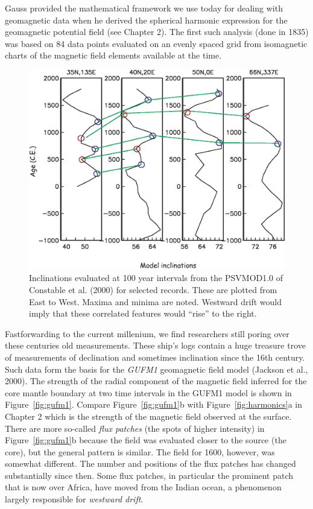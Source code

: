 Gauss provided the mathematical framework we use today for dealing with geomagnetic data when he derived the spherical harmonic expression for the geomagnetic potential field (see Chapter  2).  The first such analysis (done in 1835) was based on 84 data points evaluated on an evenly spaced grid from isomagnetic charts of  the magnetic field elements available at the time.  






\begin{figure}[htb]
\centering  \includegraphics[width=11 cm]{EPSfiles/psvmod}
\caption{Inclinations evaluated at 100 year intervals from the PSVMOD1.0 of Constable et al. (2000) for selected records.  These are plotted from East to West.  Maxima and minima are noted.  Westward drift would imply that these correlated features would ``rise'' to the right.}
\label{fig:psvmod}
\end{figure}




Fastforwarding to the current  millenium, we find researchers still poring over these centuries old measurements.    These ship's logs contain a huge treasure trove of measurements of declination and sometimes inclination since the 16th century.  Such data form the basis for the 
{\it GUFM1}  geomagnetic field model
(Jackson et al.,  2000).    \nocite{jackson00}  The strength of the radial component of the magnetic field inferred for the core mantle boundary at two time intervals in the GUFM1 model  is shown in Figure~\ref{fig:gufm1}.  Compare Figure~\ref{fig:gufm1}b with Figure~\ref{fig:harmonics}a in  Chapter 2 which is the strength of the magnetic field observed at the surface.  There are more so-called
{\it  flux patches} (the spots of higher intensity) in Figure~\ref{fig:gufm1}b because the field was evaluated closer to the source (the core), but the general pattern is similar.    The field for 1600,  however, was somewhat different.  The number and positions of the flux patches has changed substantially since then.  Some flux patches, in particular the prominent patch that is now over Africa, have moved  from the Indian ocean, a phenomenon largely responsible for  
{\it westward drift}.   

